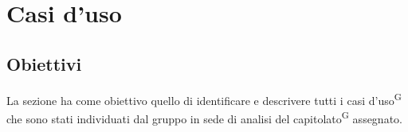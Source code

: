 \section{Casi d'uso}



\subsection{Obiettivi}
La sezione ha come obiettivo quello di identificare e descrivere tutti i casi d'uso\textsuperscript{G} che sono stati individuati dal gruppo in sede di analisi del capitolato\textsuperscript{G} assegnato.


